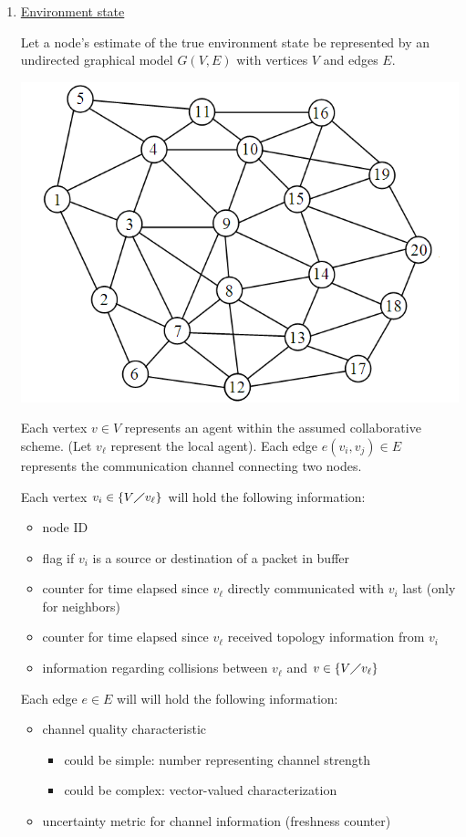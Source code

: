 \documentclass[11pt]{article}
\makeatletter
\def\maxwidth{\ifdim\Gin@nat@width>\linewidth\linewidth
    \else\Gin@nat@width\fi}
\makeatother
\begin{document}
\begin{enumerate}
\def\labelenumi{\arabic{enumi}.}
\item \underline{Environment state}

Let a node's estimate of the true environment state be represented by an undirected graphical model $G(V,E)$ with vertices $V$ and edges $E$.

\includegraphics[width=.7\maxwidth]{undirected-graph.png}


Each vertex $v \in V$ represents an agent within the assumed collaborative scheme.
(Let $v_\ell$ represent the local agent).  Each edge $e(v_i,v_j) \in E$ represents
the communication channel connecting two nodes.

Each vertex $v_i \in \{V \diagup v_\ell\}$ will hold the following information:
\begin{itemize}
\item
node ID
\item
flag if $v_i$ is a source or destination of a packet in buffer
\item
counter for time elapsed since $v_\ell$ directly communicated with $v_i$ last (only for neighbors)
\item
counter for time elapsed since $v_\ell$ received topology information from $v_i$
\item
information regarding collisions between $v_\ell$ and $v \in \{V \diagup v_\ell\}$
\end{itemize}

\pagebreak

Each edge $e \in E$ will will hold the following information:
\begin{itemize}
\item
channel quality characteristic 
\begin{itemize}
\item could be simple: number representing channel strength
\item could be complex: vector-valued characterization
\end{itemize}
\item
uncertainty metric for channel information (freshness counter)
\end{itemize}


\end{enumerate}
\end{document}
